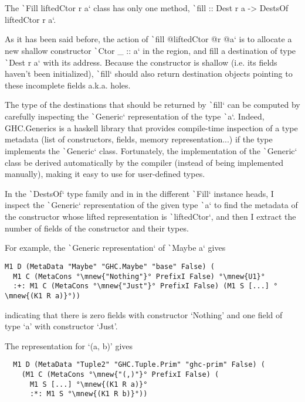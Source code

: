 \documentclass[english]{jflart}
\begin{document}
The \texttt`Fill liftedCtor r a` class has only one method, \texttt`fill :: Dest r a -> DestsOf liftedCtor r a`.

As it has been said before, the action of \texttt`fill @liftedCtor @r @a` is to allocate a new shallow constructor \texttt`Ctor _ :: a` in the region, and fill a destination of type \texttt`Dest r a` with its address. Because the constructor is shallow (i.e. its fields haven't been initialized), \texttt`fill` should also return destination objects pointing to these incomplete fields a.k.a. holes.

The type of the destinations that should be returned by \texttt`fill` can be computed by carefully inspecting the \texttt`Generic` representation of the type \texttt`a`. Indeed, GHC.Generics is a haskell library that provides compile-time inspection of a type metadata (list of constructors, fields, memory representation...) if the type implements the \texttt`Generic` class. Fortunately, the implementation of the \texttt`Generic` class be derived automatically by the compiler (instead of being implemented manually), making it easy to use for user-defined types.

In the \texttt`DestsOf` type family and in in the different \texttt`Fill` instance heads, I inspect the \texttt`Generic` representation of the given type \texttt`a` to find the metadata of the constructor whose lifted representation is \texttt`liftedCtor`, and then I extract the number of fields of the constructor and their types.

For example, the \texttt`Generic representation` of \texttt`Maybe a` gives

\begin{verbatim}
M1 D (MetaData "Maybe" "GHC.Maybe" "base" False) (
  M1 C (MetaCons °\mnew{"Nothing"}° PrefixI False) °\mnew{U1}°
  :+: M1 C (MetaCons °\mnew{"Just"}° PrefixI False) (M1 S [...] °\mnew{(K1 R a)}°))
\end{verbatim}

indicating that there is zero fields with constructor `Nothing' and one field of type `a' with constructor `Just'. 


The representation for `(a, b)' gives

\begin{verbatim}
  M1 D (MetaData "Tuple2" "GHC.Tuple.Prim" "ghc-prim" False) (
    (M1 C (MetaCons °\mnew{"(,)"}° PrefixI False) (
      M1 S [...] °\mnew{(K1 R a)}°
      :*: M1 S °\mnew{(K1 R b)}°))
\end{verbatim}
\end{document}
